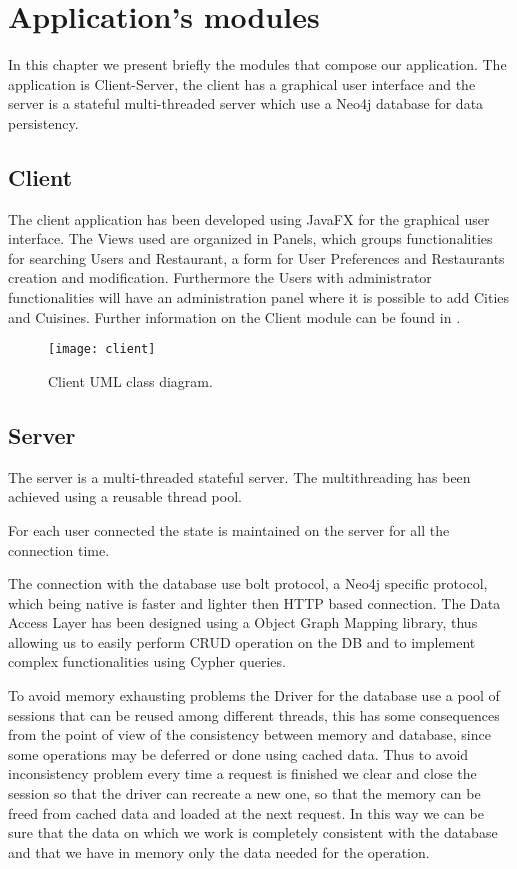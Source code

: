 \chapter{Application's modules}\label{ch:modules}
In this chapter we present briefly the modules that compose our application.
The application is Client-Server, the client has a graphical user interface and
the server is a stateful multi-threaded server which use a Neo4j database for
data persistency.

\section{Client}\label{sec:client}

The client application has been developed using JavaFX for the graphical user
interface. The Views used are organized in Panels, which groups functionalities
for searching Users and Restaurant, a form for User Preferences and Restaurants
creation and modification. Furthermore the Users with administrator
functionalities will have an administration panel where it is possible to add
Cities and Cuisines. Further information on the Client module can be found in
.

\begin{figure}[!h]
	\texttt{[image: client]}
	\caption{Client UML class diagram.}\label{fig:client}
\end{figure}

\section{Server}\label{sec:server}

The server is a multi-threaded stateful server. The multithreading has been
achieved using a reusable thread pool.

For each user connected the state is maintained on the server for all the
connection time.

The connection with the database use bolt protocol, a Neo4j specific protocol,
which being native is faster and lighter then HTTP based connection. The Data
Access Layer has been designed using a Object Graph Mapping library, thus
allowing us to easily perform CRUD operation on the DB and to implement complex
functionalities using Cypher queries.

To avoid memory exhausting problems the Driver for the database use a pool of
sessions that can be reused among different threads, this has some consequences
from the point of view of the consistency between memory and database, since
some operations may be deferred or done using cached data. Thus to avoid
inconsistency problem every time a request is finished we clear and close the
session so that the driver can recreate a new one, so that the memory can be
freed from cached data and loaded at the next request. In this way  we can be
sure that the data on which we work is completely consistent with the database
and that we have in memory only the data needed for the operation.

